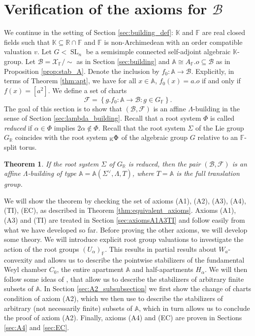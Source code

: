 \documentclass[12pt]{amsart}
\newcommand{\F}{\mathbb{F} }
\newcommand{\R}{\mathbb{R} }
\newcommand{\X}{\mathcal{X}}
\newcommand{\K}{\mathbb{K}}
\newcommand{\A}{\mathbb{A}}
\newcommand{\Fun}{\mathscr{F}} %
\newcommand{\B}{\mathcal{B}}
\newcommand{\KPhi}{\vphantom{\Phi}_{\K}\Phi}
\numberwithin{equation}{section}
\newtheorem{theorem}{Theorem}[section]
\theoremstyle{remark} %
\begin{document}


 
 
 


\section{Verification of the axioms for \texorpdfstring{$\B$}{B}}\label{sec:Bisbuilding} 

We continue in the setting of Section \ref{sec:building_def}: $\K$ and $\F$ are real closed fields such that $\K \subseteq \R \cap \F$ and $\F$ is non-Archimedean with an order compatible valuation $v$. Let $G<\operatorname{SL}_n$ be a semisimple connected self-adjoint algebraic $\K$-group. Let $\B = \X_\F/\!\sim$ as in Section \ref{sec:building} and $\A \cong A_\F.o  \subseteq \B$ as in Proposition \ref{prop:stab_A}. Denote the inclusion by $f_0 \colon \A \to \B$. Explicitly, in terms of Theorem \ref{thm:apt}, we have for all $x\in \A$, $f_0(x) = a.o$ if and only if $f(x)=[a^2]$. We define a set of charts
$$
\Fun = \left\{ g.f_0 \colon \A \to \B \colon g \in G_\F \right\}.
$$
The goal of this section is to show that $(\B,\Fun)$ is an affine $\Lambda$-building in the sense of Section \ref{sec:lambda_building}. Recall that a root system $\Phi$ is called \emph{reduced} if $\alpha \in \Phi$ implies $2\alpha \notin \Phi$. Recall that the root system $\Sigma$ of the Lie group $G_\R$ coincides with the root system $\KPhi$ of the algebraic group $G$ relative to an $\F$-split torus.

\begin{theorem}\label{thm:B_is_building}
	If the root system $\Sigma$ of $G_\R$ is reduced, then the pair $(\B,\Fun)$ is an affine $\Lambda$-building of type $\A = \A(\Sigma^\vee,\Lambda,T)$, where $T=\A$ is the full translation group.
\end{theorem}

We will show the theorem by checking the set of axioms (A1), (A2), (A3), (A4), (TI), (EC), as described in Theorem \ref{thm:equivalent_axioms}. Axioms (A1), (A3) and (TI) are treated in Section \ref{sec:axiomsA1A3TI} and follow easily from what we have developed so far.
Before proving the other axioms, we will develop some theory. We will introduce explicit root group valuations to investigate the action of the root groups $(U_\alpha)_\F$. This results in partial results about $W_a$-convexity and allows us to describe the pointwise stabilizers of the fundamental Weyl chamber $C_0$, the entire apartment $\A$ and half-apartments $H_\alpha$. We will then follow some ideas of \cite{BrTi, Lan96}, that allow us to describe the stabilizers of arbitrary finite subsets of $\A$. In Section \ref{sec:A2_subsubsection} we first show the change of charts condition of axiom (A2), which we then use to describe the stabilizers of arbitrary (not necessarily finite) subsets of $\A$, which in turn allows us to conclude the proof of axiom (A2). Finally, axioms (A4) and (EC) are proven in Sections \ref{sec:A4} and \ref{sec:EC}.
 
\end{document}
